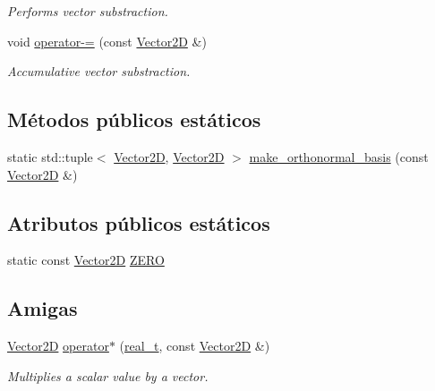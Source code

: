 \begin{DoxyCompactItemize}
\begin{DoxyCompactList}\small\item\em Performs vector substraction. \end{DoxyCompactList}\item 
void \hyperlink{class_designar_1_1_vector2_d_a47923d4edc621e324d793df3ac2678a7}{operator-\/=} (const \hyperlink{class_designar_1_1_vector2_d}{Vector2D} \&)
\begin{DoxyCompactList}\small\item\em Accumulative vector substraction. \end{DoxyCompactList}\end{DoxyCompactItemize}
\subsection*{Métodos públicos estáticos}
\begin{DoxyCompactItemize}
\item 
static std\+::tuple$<$ \hyperlink{class_designar_1_1_vector2_d}{Vector2D}, \hyperlink{class_designar_1_1_vector2_d}{Vector2D} $>$ \hyperlink{class_designar_1_1_vector2_d_a794f762b2d8cdce1ff429e1049440b5b}{make\+\_\+orthonormal\+\_\+basis} (const \hyperlink{class_designar_1_1_vector2_d}{Vector2D} \&)
\end{DoxyCompactItemize}
\subsection*{Atributos públicos estáticos}
\begin{DoxyCompactItemize}
\item 
static const \hyperlink{class_designar_1_1_vector2_d}{Vector2D} \hyperlink{class_designar_1_1_vector2_d_a69058a422d5a1317e1047949f01cc131}{Z\+E\+RO}
\end{DoxyCompactItemize}
\subsection*{Amigas}
\begin{DoxyCompactItemize}
\item 
\hyperlink{class_designar_1_1_vector2_d}{Vector2D} \hyperlink{class_designar_1_1_vector2_d_aca9e39dbbbc406c5d35f20b4628b8391}{operator$\ast$} (\hyperlink{namespace_designar_aca2c32af26808dbec1f3a3071fad25ce}{real\+\_\+t}, const \hyperlink{class_designar_1_1_vector2_d}{Vector2D} \&)
\begin{DoxyCompactList}\small\item\em Multiplies a scalar value by a vector. \end{DoxyCompactList}\end{DoxyCompactItemize}

